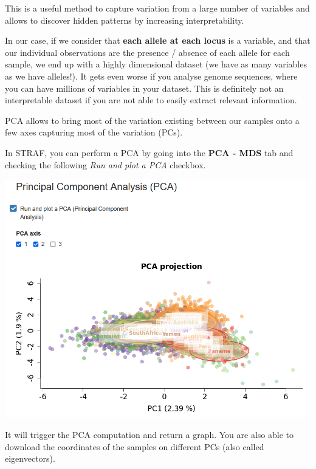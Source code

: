 \documentclass[
]{book}
\begin{document}
This is a useful method to capture variation from a large number of variables and
allows to discover hidden patterns by increasing interpretability.

In our case, if we consider that \textbf{each allele at each locus} is a variable, and that
our individual observations are the presence / absence of each allele for each sample,
we end up with a highly dimensional dataset (we have as many variables as we have
alleles!). It gets even worse if you analyse genome sequences, where you can have millions
of variables in your dataset. This is definitely not an interpretable dataset if you
are not able to easily extract relevant information.

PCA allows to bring most of the variation existing between our samples onto a few
axes capturing most of the variation (PCs).

In STRAF, you can perform a PCA by going into the \textbf{PCA - MDS} tab and checking
the following \emph{Run and plot a PCA} checkbox.

\includegraphics[width=1\linewidth]{img/capture_pca_1}

It will trigger the PCA computation and return a graph. You are also able to
download the coordinates of the samples on different PCs (also called eigenvectors).
\end{document}
